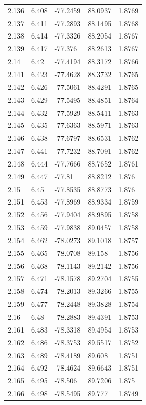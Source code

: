 \begin{tabular}{lllll}
2.136 & 6.408 & -77.2459 & 88.0937 & 1.8769 \\
2.137 & 6.411 & -77.2893 & 88.1495 & 1.8768 \\
2.138 & 6.414 & -77.3326 & 88.2054 & 1.8767 \\
2.139 & 6.417 & -77.376 & 88.2613 & 1.8767 \\
2.14 & 6.42 & -77.4194 & 88.3172 & 1.8766 \\
2.141 & 6.423 & -77.4628 & 88.3732 & 1.8765 \\
2.142 & 6.426 & -77.5061 & 88.4291 & 1.8765 \\
2.143 & 6.429 & -77.5495 & 88.4851 & 1.8764 \\
2.144 & 6.432 & -77.5929 & 88.5411 & 1.8763 \\
2.145 & 6.435 & -77.6363 & 88.5971 & 1.8763 \\
2.146 & 6.438 & -77.6797 & 88.6531 & 1.8762 \\
2.147 & 6.441 & -77.7232 & 88.7091 & 1.8762 \\
2.148 & 6.444 & -77.7666 & 88.7652 & 1.8761 \\
2.149 & 6.447 & -77.81 & 88.8212 & 1.876 \\
2.15 & 6.45 & -77.8535 & 88.8773 & 1.876 \\
2.151 & 6.453 & -77.8969 & 88.9334 & 1.8759 \\
2.152 & 6.456 & -77.9404 & 88.9895 & 1.8758 \\
2.153 & 6.459 & -77.9838 & 89.0457 & 1.8758 \\
2.154 & 6.462 & -78.0273 & 89.1018 & 1.8757 \\
2.155 & 6.465 & -78.0708 & 89.158 & 1.8756 \\
2.156 & 6.468 & -78.1143 & 89.2142 & 1.8756 \\
2.157 & 6.471 & -78.1578 & 89.2704 & 1.8755 \\
2.158 & 6.474 & -78.2013 & 89.3266 & 1.8755 \\
2.159 & 6.477 & -78.2448 & 89.3828 & 1.8754 \\
2.16 & 6.48 & -78.2883 & 89.4391 & 1.8753 \\
2.161 & 6.483 & -78.3318 & 89.4954 & 1.8753 \\
2.162 & 6.486 & -78.3753 & 89.5517 & 1.8752 \\
2.163 & 6.489 & -78.4189 & 89.608 & 1.8751 \\
2.164 & 6.492 & -78.4624 & 89.6643 & 1.8751 \\
2.165 & 6.495 & -78.506 & 89.7206 & 1.875 \\
2.166 & 6.498 & -78.5495 & 89.777 & 1.8749 \\

\end{tabular}
